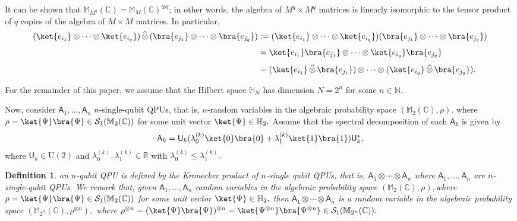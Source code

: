 \documentclass[a4paper,11pt]{article}
\newtheorem{definition}[theorem]{Definition}
\newcommand{\rU}{\mathsf{U}}
\newcommand{\rA}{\mathsf{A}}
\begin{document}
It can be shown that \(\mathbb{M}_{M^q}(\mathbb{C})= \mathbb{M}_{M}(\mathbb{C})^{\otimes q}\); in other words, the algebra of \(M^q \times M^q\) matrices is linearly isomorphic to the tensor product of \(q\) copies of the algebra of \(M \times M\) matrices. In particular,
\begin{align*}
(\ket{e_{i_1}} \otimes \cdots \otimes \ket{e_{i_q}})\,\widehat{\otimes}\,(\bra{e_{j_1}} \otimes \cdots \otimes \bra{e_{j_q}})
&:= (\ket{e_{i_1}} \otimes \cdots \otimes \ket{e_{i_q}})
(\bra{e_{j_1}} \otimes \cdots \otimes \bra{e_{j_q}})\\[1ex]
&= \ket{e_{i_1}}\bra{e_{j_1}} \otimes \cdots \otimes \ket{e_{i_q}}\bra{e_{j_q}}\\[1ex]
&= (\ket{e_{i_1}}\,\widehat{\otimes}\,\bra{e_{j_1}}) \otimes \cdots \otimes (\ket{e_{i_q}}\,\widehat{\otimes}\,\bra{e_{j_q}}).
\end{align*}

\bigskip

For the remainder of this paper, we assume that the Hilbert space $\mathbb{H}_N$ has dimension \(N = 2^n\) for some \(n \in \mathbb{N}\). 

\bigskip

Now, consider $\rA_1,\ldots, \rA_n$  $n$-single-qubit QPUs, that is, $n$-random variables in the algebraic probability space $(\mathbb{M}_2(\mathbb{C}),\rho).$ where $\rho = \ket{\Psi}\bra{\Psi} \in \mathcal{S}_1(\mathbb{M}_2(\mathbb{C}))$ for some unit vector $\ket{\Psi} \in \mathbb{H}_2.$ Assume that the spectral decomposition of each $\rA_k$ is given by
\begin{align}\label{QPU}
\rA_k = \rU_k (\lambda_{0}^{(k)} \ket{0}\bra{0} + \lambda_{1}^{(k)} \ket{1}\bra{1}) \rU_k^{\star},  
\end{align}
where $\rU_k \in \mathrm{U}(2)$ and $\lambda_{0}^{(k)},\lambda_{1}^{(k)} \in \mathbb{R}$ with $\lambda_{0}^{(k)} \le \lambda_{1}^{(k)}.$

\begin{definition}
an $n$-qubit QPU is defined by the Kronecker product of $n$-single qubit QPUs, that is, $\rA_1 \otimes \cdots \otimes \rA_n$ where  $\rA_1,\ldots, \rA_n$  are $n$-single-qubit QPUs. We remark that, given 
 $\rA_1,\ldots, \rA_n$ random variables in the algebraic probability space  $(\mathbb{M}_2(\mathbb{C}),\rho),$where $\rho = \ket{\Psi}\bra{\Psi} \in \mathcal{S}_1(\mathbb{M}_2(\mathbb{C}))$ for some unit vector $\ket{\Psi} \in \mathbb{H}_2,$ then $\rA_1 \otimes \cdots \otimes \rA_n$ is a random variable in the algebraic probability space $(\mathbb{M}_{2^n}(\mathbb{C}),\rho^{\otimes n}),$ where $\rho^{\otimes n} = (\ket{\Psi}\bra{\Psi})^{\otimes n} = \ket{\Psi^{\otimes n}}\bra{\Psi^{\otimes n}}  \in \mathcal{S}_1(\mathbb{M}_{2^n}(\mathbb{C})).$ 
\end{definition}
\end{document}
